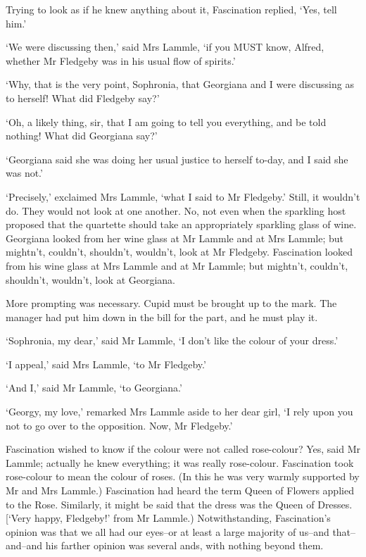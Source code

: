 Trying to look as if he knew anything about it, Fascination replied,
‘Yes, tell him.’

‘We were discussing then,’ said Mrs Lammle, ‘if you MUST know, Alfred,
whether Mr Fledgeby was in his usual flow of spirits.’

‘Why, that is the very point, Sophronia, that Georgiana and I were
discussing as to herself! What did Fledgeby say?’

‘Oh, a likely thing, sir, that I am going to tell you everything, and be
told nothing! What did Georgiana say?’

‘Georgiana said she was doing her usual justice to herself to-day, and I
said she was not.’

‘Precisely,’ exclaimed Mrs Lammle, ‘what I said to Mr Fledgeby.’ Still,
it wouldn’t do. They would not look at one another. No, not even
when the sparkling host proposed that the quartette should take an
appropriately sparkling glass of wine. Georgiana looked from her wine
glass at Mr Lammle and at Mrs Lammle; but mightn’t, couldn’t, shouldn’t,
wouldn’t, look at Mr Fledgeby. Fascination looked from his wine glass
at Mrs Lammle and at Mr Lammle; but mightn’t, couldn’t, shouldn’t,
wouldn’t, look at Georgiana.

More prompting was necessary. Cupid must be brought up to the mark. The
manager had put him down in the bill for the part, and he must play it.

‘Sophronia, my dear,’ said Mr Lammle, ‘I don’t like the colour of your
dress.’

‘I appeal,’ said Mrs Lammle, ‘to Mr Fledgeby.’

‘And I,’ said Mr Lammle, ‘to Georgiana.’

‘Georgy, my love,’ remarked Mrs Lammle aside to her dear girl, ‘I rely
upon you not to go over to the opposition. Now, Mr Fledgeby.’

Fascination wished to know if the colour were not called rose-colour?
Yes, said Mr Lammle; actually he knew everything; it was really
rose-colour. Fascination took rose-colour to mean the colour of roses.
(In this he was very warmly supported by Mr and Mrs Lammle.) Fascination
had heard the term Queen of Flowers applied to the Rose. Similarly, it
might be said that the dress was the Queen of Dresses. [‘Very happy,
Fledgeby!’ from Mr Lammle.) Notwithstanding, Fascination’s opinion
was that we all had our eyes--or at least a large majority of us--and
that--and--and his farther opinion was several ands, with nothing beyond
them.

